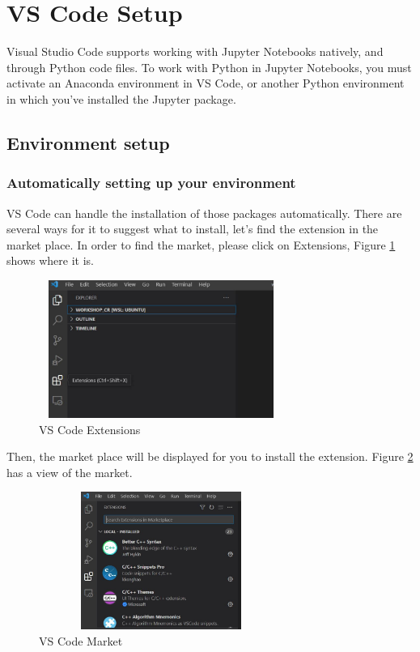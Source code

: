 \documentclass{assignment}
\begin{document}
\section{VS Code Setup}
\label{sec:vs_code}
% 

Visual Studio Code supports working with Jupyter Notebooks natively, and through Python code files. To work with Python in Jupyter Notebooks, you must activate an Anaconda environment in VS Code, or another Python environment in which you've installed the Jupyter package. 

\subsection{Environment setup}

\subsubsection{Automatically setting up your environment}
\label{sub:auto}

VS Code can handle the installation of those packages automatically. There are several ways for it to suggest what to install, let's find the extension in the market place. In order to find the market, please click on Extensions, Figure \ref{fig:extensions} shows where it is.

\begin{figure}[h]
 \centering 
    \includegraphics[width=8cm, height=4.5cm]{assets/vs_code_extensions.JPG}
    \caption{VS Code Extensions}
    \label{fig:extensions}
\end{figure}

Then, the market place will be displayed for you to install the extension. Figure \ref{fig:market} has a view of the market.

\begin{figure}[h]
 \centering 
    \includegraphics[width=8cm, height=4.5cm]{assets/vs_code_market_place.JPG}
    \caption{VS Code Market}
    \label{fig:market}
\end{figure}
\end{document}
